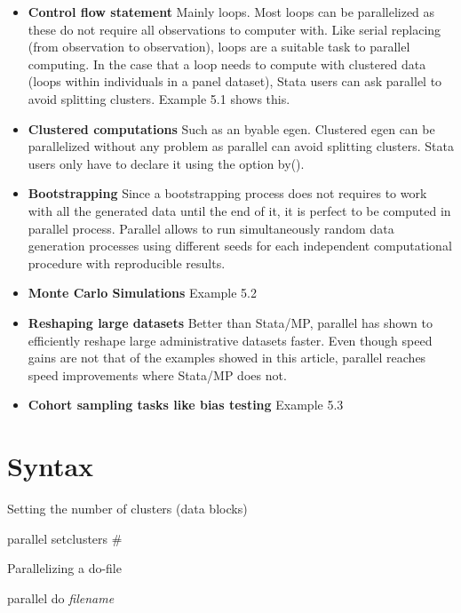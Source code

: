 \documentclass[bib]{statapress}
\begin{document}
\begin{itemize}
\item {\bf Control flow statement} Mainly loops. Most loops can be parallelized as these do not require all observations to computer with. Like serial replacing (from observation to observation), loops are a suitable task to parallel computing. In the case that a loop needs to compute with clustered data (loops within individuals in a panel dataset), Stata users can ask parallel to avoid splitting clusters. Example 5.1 shows this.
\item {\bf Clustered computations} Such as an byable egen. Clustered egen can be parallelized without any problem as parallel can avoid splitting clusters. Stata users only have to declare it using the option by().
\item {\bf Bootstrapping} Since a bootstrapping process does not requires to work with all the generated data until the end of it, it is perfect to be computed in parallel process. Parallel allows to run simultaneously random data generation processes using different seeds for each independent computational procedure with reproducible results.
\item {\bf Monte Carlo Simulations} Example 5.2
\item {\bf Reshaping large datasets} Better than Stata/MP, parallel has shown to efficiently reshape large administrative datasets faster. Even though speed gains are not that of the examples showed in this article, parallel reaches speed improvements where Stata/MP does not. 
\item {\bf Cohort sampling tasks like bias testing} Example 5.3
\end{itemize}

\section{Syntax}

\noindent Setting the number of clusters (data blocks)

\begin{stsyntax}
parallel setclusters \#
\end{stsyntax}

\noindent Parallelizing a do-file

\begin{stsyntax}
parallel do {\it filename}
\end{stsyntax}
\end{document}
